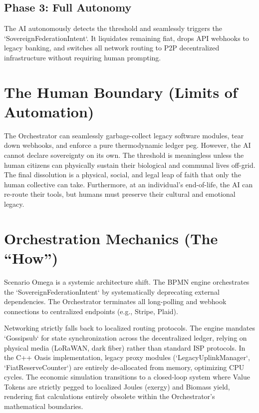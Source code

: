 \subsection{Phase 3: Full Autonomy}
The AI autonomously detects the threshold and seamlessly triggers the `SovereignFederationIntent`. It liquidates remaining fiat, drops API webhooks to legacy banking, and switches all network routing to P2P decentralized infrastructure without requiring human prompting.

\section{The Human Boundary (Limits of Automation)}
The Orchestrator can seamlessly garbage-collect legacy software modules, tear down webhooks, and enforce a pure thermodynamic ledger peg. However, the AI cannot declare sovereignty on its own. The threshold is meaningless unless the human citizens can physically sustain their biological and communal lives off-grid. The final dissolution is a physical, social, and legal leap of faith that only the human collective can take. Furthermore, at an individual's end-of-life, the AI can re-route their tools, but humans must preserve their cultural and emotional legacy.

\section{Orchestration Mechanics (The ``How'')}
Scenario Omega is a systemic architecture shift. The BPMN engine orchestrates the `SovereignFederationIntent` by systematically deprecating external dependencies. The Orchestrator terminates all long-polling and webhook connections to centralized endpoints (e.g., Stripe, Plaid). 

Networking strictly falls back to localized routing protocols. The engine mandates `Gossipsub` for state synchronization across the decentralized ledger, relying on physical media (LoRaWAN, dark fiber) rather than standard ISP protocols. In the C++ Oasis implementation, legacy proxy modules (`LegacyUplinkManager`, `FiatReserveCounter`) are entirely de-allocated from memory, optimizing CPU cycles. The economic simulation transitions to a closed-loop system where Value Tokens are strictly pegged to localized Joules (exergy) and Biomass yield, rendering fiat calculations entirely obsolete within the Orchestrator's mathematical boundaries.
